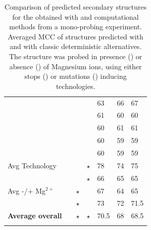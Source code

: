 \documentclass[a4,center,fleqn]{NAR}
\begin{document}
\begin{table}
{\begin{adjustbox}{max width=\linewidth}
\begin{tabular}{@{}lcccHHH}
			\DMSMg                      &  &  \Stop  &    \Mg    & 63                       & 66      & 67      \\
			\NMIACE                     &  &  \Stop  &   \NoMg   & 61                       & 60      & 60      \\
			\OneMSevCE                  &  &  \Stop  &   \NoMg   & 60                       & 61      & 61      \\
			\BzCN                       &  &  \Stop  &   \NoMg   & 60                       & 59      & 59      \\
			\NAICE                      &  &  \Stop  &   \NoMg   & 60                       & 59      & 59      \\ \midrule
			Avg Technology              &          &  \Mut   &  $\star$  & 78                       & 74      & 75      \\
			                            &          &  \Stop  &  $\star$  & 66                       & 65      & 65      \\
			Avg -/+ Mg$^{2+}$           &          & $\star$ &   \NoMg   & 67                       & 64      & 65      \\
			                            &          & $\star$ &    \Mg    & 73                       & 72      & 71.5    \\ \midrule
			{\bfseries Average overall} &          & $\star$ &  $\star$  & 70.5                     & 68      & 68.5    \\ \bottomrule
			                            &          &         &           &                          &
		\end{tabular}
		\end{adjustbox}\\[1em]}
	
	\caption{Comparison of predicted secondary structures for the \didy{} obtained with \OurTool{} and computational methods from a mono-probing experiment. Averaged MCC of structures predicted with \OurTool{} and with classic deterministic alternatives. The structure was probed in presence (\Mg) or absence (\NoMg) of Magnesium ions, using either stops (\Stop) or mutations (\Mut) inducing technologies.
	}
	\label{tab:thermo-ipan}
\end{table}
\end{document}
